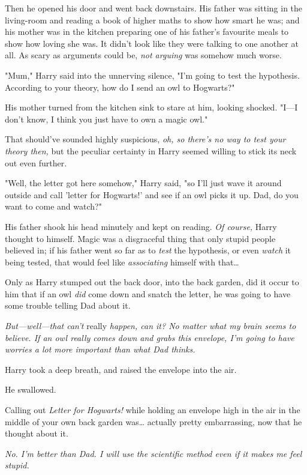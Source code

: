 Then he opened his door and went back downstairs. His father was sitting in the 
living-room and reading a book of higher maths to show how smart he was; and 
his mother was in the kitchen preparing one of his father's favourite meals to 
show how loving she was. It didn't look like they were talking to one another 
at all. As scary as arguments could be, \emph{not arguing} was somehow much 
worse.

"Mum," Harry said into the unnerving silence, "I'm going to test the 
hypothesis. According to your theory, how do I send an owl to Hogwarts?"

His mother turned from the kitchen sink to stare at him, looking shocked. 
"I---I don't know, I think you just have to own a magic owl."

That should've sounded highly suspicious, \emph{oh, so there's no way to test 
your theory then,} but the peculiar certainty in Harry seemed willing to stick 
its neck out even further.

"Well, the letter got here somehow," Harry said, "so I'll just wave it around 
outside and call 'letter for Hogwarts!' and see if an owl picks it up. Dad, do 
you want to come and watch?"

His father shook his head minutely and kept on reading. \emph{Of course,} Harry 
thought to himself. Magic was a disgraceful thing that only stupid people 
believed in; if his father went so far as to \emph{test} the hypothesis, or 
even \emph{watch} it being tested, that would feel like \emph{associating} 
himself with that{\ldots}

Only as Harry stumped out the back door, into the back garden, did it occur to 
him that if an owl \emph{did} come down and snatch the letter, he was going to 
have some trouble telling Dad about it.

\emph{But---well---that can't} really\emph{ happen, can it? No matter what my 
brain seems to believe. If an owl really comes down and grabs this envelope, 
I'm going to have worries a lot more important than what Dad thinks.}

Harry took a deep breath, and raised the envelope into the air.

He swallowed.

Calling out \emph{Letter for Hogwarts!} while holding an envelope high in the 
air in the middle of your own back garden was{\ldots} actually pretty 
embarrassing, now that he thought about it.

\emph{No. I'm better than Dad. I will use the scientific method even if it 
makes me feel stupid.}

